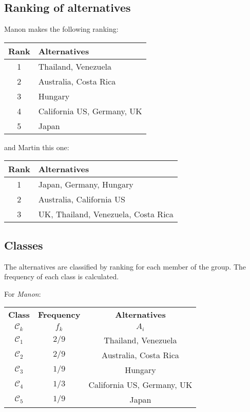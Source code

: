 \documentclass[12pt,a4paper]{article}
\begin{document}
\subsection{Ranking of alternatives}
Manon makes the following ranking:
\begin{table}[h]
\centering
\begin{tabular}{|c|l|}
\hline
\textbf{Rank}&\textbf{Alternatives}\\
\hline
1 & Thailand, Venezuela \\
2 & Australia, Costa Rica \\
3 & Hungary \\
4 & California US, Germany, UK \\
5 & Japan \\
\hline
\end{tabular}
\end{table}


and Martin this one:

\begin{table}[h]
\centering
\begin{tabular}{|c|l|}
\hline
\textbf{Rank}&\textbf{Alternatives}\\
\hline
1 & Japan, Germany, Hungary \\
2 & Australia, California US \\
3 & UK, Thailand, Venezuela, Costa Rica \\
\hline
\end{tabular}
\end{table}

\subsection{Classes}

The alternatives are classified by ranking for each member of the group. The frequency of each class is calculated.

For \textsl{Manon}:

\begin{table}[h]
\centering
\begin{tabular}{|c|c|c|}
\hline
\textbf{Class}&\textbf{Frequency} &\textbf{Alternatives}\\
$\mathcal{C}_k$ & $f_k$ & $A_i$ \\
\hline
$\mathcal{C}_1$ & $2/9$ & Thailand, Venezuela \\
$\mathcal{C}_2$ & $2/9$ & Australia, Costa Rica \\
$\mathcal{C}_3$ & $1/9$ & Hungary \\
$\mathcal{C}_4$ & $1/3$ & California US, Germany, UK \\
$\mathcal{C}_5$ & $1/9$ & Japan \\
\hline
\end{tabular}
\end{table}
\end{document}
